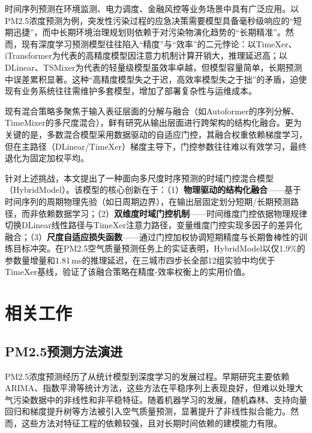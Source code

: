 \documentclass[12pt,a4paper]{article}
\begin{document}
时间序列预测在环境监测、电力调度、金融风控等业务场景中具有广泛应用。以PM2.5浓度预测为例，突发性污染过程的应急决策需要模型具备毫秒级响应的``短期迅捷''，而中长期环境治理规划则依赖于对污染物演化趋势的``长期精准''。然而，现有深度学习预测模型往往陷入``精度''与``效率''的二元悖论：以TimeXer\cite{wang2024timexer}、iTransformer\cite{liu2023itransformer}为代表的高精度模型因注意力机制计算开销大，推理延迟高；以DLinear\cite{zeng2023transformers}、TSMixer\cite{chen2023tsmixer}为代表的轻量级模型虽效率卓越，但模型容量简单，长期预测中误差累积显著。这种``高精度模型失之于迟，高效率模型失之于拙''的矛盾，迫使现有业务系统往往需维护多套模型，增加了部署复杂性与运维成本。

现有混合策略多聚焦于输入表征层面的分解与融合（如Autoformer\cite{wu2021autoformer}的序列分解、TimeMixer\cite{wang2024timemixer}的多尺度混合），鲜有研究从输出层面进行跨架构的结构化融合。更为关键的是，多数混合模型采用数据驱动的自适应门控，其融合权重依赖梯度学习，但在主路径（DLinear/TimeXer）梯度主导下，门控参数往往难以有效学习，最终退化为固定加权平均。

针对上述挑战，本文提出了一种面向多尺度时序预测的时域门控混合模型（HybridModel）。该模型的核心创新在于：（1）\textbf{物理驱动的结构化融合}——基于时间序列的周期物理先验（如日周期边界），在输出层固定划分短期/长期预测路径，而非依赖数据学习；（2）\textbf{双维度时域门控机制}——时间维度门控依据物理规律切换DLinear线性路径与TimeXer注意力路径，变量维度门控实现多因子的差异化融合；（3）\textbf{尺度自适应损失函数}——通过门控加权协调短期精度与长期鲁棒性的训练目标冲突。在PM2.5空气质量预测任务上的实证表明，HybridModel以仅1.9\%的参数量增量和1.81\,ms的推理延迟，在三城市四步长全部12组实验中均优于TimeXer基线，验证了该融合策略在精度-效率权衡上的实用价值。

\section{相关工作}

\subsection{PM2.5预测方法演进}

PM2.5浓度预测经历了从统计模型到深度学习的发展过程\cite{lim2021time}。早期研究主要依赖ARIMA、指数平滑等统计方法，这些方法在平稳序列上表现良好，但难以处理大气污染数据中的非线性和非平稳特征\cite{box2015time}。随着机器学习的发展，随机森林、支持向量回归和梯度提升树等方法被引入空气质量预测，显著提升了非线性拟合能力。然而，这些方法对特征工程的依赖较强，且对长期时间依赖的建模能力有限\cite{mendez2023machine}。
\end{document}
